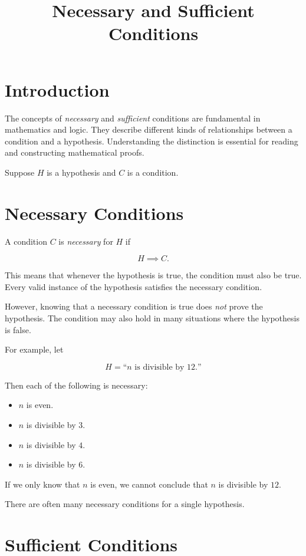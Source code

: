 \documentclass{essay}
\title{Necessary and Sufficient Conditions}
\author{}
\date{}
\begin{document}
\maketitle

\section*{Introduction}

The concepts of \emph{necessary} and \emph{sufficient} conditions are fundamental in mathematics and logic. They describe different kinds of relationships between a condition and a hypothesis. Understanding the distinction is essential for reading and constructing mathematical proofs.

Suppose \(H\) is a hypothesis and \(C\) is a condition.

\section*{Necessary Conditions}

A condition \(C\) is \emph{necessary} for \(H\) if

\[ H \implies C. \]

This means that whenever the hypothesis is true, the condition must also be true. Every valid instance of the hypothesis satisfies the necessary condition.

However, knowing that a necessary condition is true does \emph{not} prove the hypothesis. The condition may also hold in many situations where the hypothesis is false.

For example, let

\[
  H = \text{``\(n\) is divisible by 12.''}
\]

Then each of the following is necessary:

\begin{itemize}
  \item \(n\) is even.
  \item \(n\) is divisible by \(3\).
  \item \(n\) is divisible by \(4\).
  \item \(n\) is divisible by \(6\).
\end{itemize}

If we only know that \(n\) is even, we cannot conclude that \(n\) is divisible by \(12\).

There are often many necessary conditions for a single hypothesis.

\section*{Sufficient Conditions}
\end{document}
